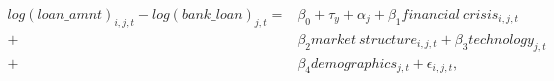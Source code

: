 \begin{equation}\begin{split}
log(loan\_amnt)_{i,j,t} - log(bank\_loan)_{j,t} = & \beta_0 + \tau_{y} + \alpha_{j} + \beta_1 financial\ crisis_{i,j,t} \\ 
+ &  \beta_2 market\ structure_{i,j,t} + \beta_3 technology_{j,t}\\ 
+ &  \beta_4 demographics_{j,t} +\epsilon_{i,j,t},
     \end{split}\end{equation}
